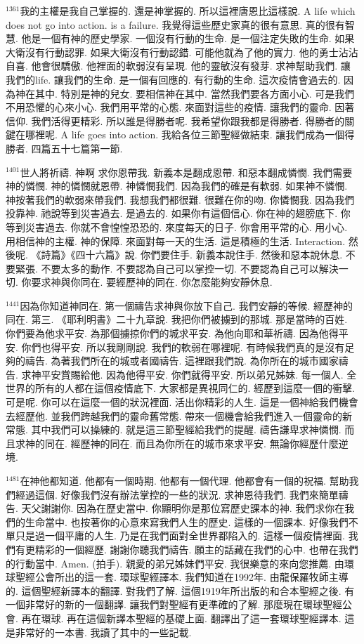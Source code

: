 \documentclass{book}
\begin{document}
$^{1361}$我的主權是我自己掌握的.
還是神掌握的.
所以這裡唐恩比這樣說.
A life which does not go into action.
is a failure.
我覺得這些歷史家真的很有意思.
真的很有智慧.
他是一個有神的歷史學家.
一個沒有行動的生命.
是一個注定失敗的生命.
如果大衛沒有行動認罪.
如果大衛沒有行動認錯.
可能他就為了他的實力.
他的勇士沾沾自喜.
他會很驕傲.
他裡面的軟弱沒有呈現.
他的靈敏沒有發芽.
求神幫助我們.
讓我們的life.
讓我們的生命.
是一個有回應的.
有行動的生命.
這次疫情會過去的.
因為神在其中.
特別是神的兒女.
要相信神在其中.
當然我們要各方面小心.
可是我們不用恐懼的心來小心.
我們用平常的心態.
來面對這些的疫情.
讓我們的靈命.
因著信仰.
我們活得更精彩.
所以誰是得勝者呢.
我希望你跟我都是得勝者.
得勝者的關鍵在哪裡呢.
A life goes into action.
我給各位三節聖經做結束.
讓我們成為一個得勝者.
四篇五十七篇第一節.

$^{1401}$世人將祈禱.
神啊 求你恩帶我.
新義本是翻成恩帶.
和惡本翻成憐憫.
我們需要神的憐憫.
神的憐憫就恩帶.
神憐憫我們.
因為我們的確是有軟弱.
如果神不憐憫.
神按著我們的軟弱來帶我們.
我想我們都很難.
很難在你的吻.
你憐憫我.
因為我們投靠神.
祂說等到災害過去.
是過去的.
如果你有這個信心.
你在神的翅膀底下.
你等到災害過去.
你就不會惶惶恐恐的.
來度每天的日子.
你會用平常的心.
用小心.
用相信神的主權.
神的保障.
來面對每一天的生活.
這是積極的生活.
Interaction.
然後呢.
《詩篇》《四十六篇》說.
你們要住手.
新義本說住手.
然後和惡本說休息.
不要緊張.
不要太多的動作.
不要認為自己可以掌控一切.
不要認為自己可以解決一切.
你要求神與你同在.
要經歷神的同在.
你怎麼能夠安靜休息.

$^{1441}$因為你知道神同在.
第一個禱告求神與你放下自己.
我們安靜的等候.
經歷神的同在.
第三.
《耶利明書》二十九章說.
我把你們被擄到的那城.
那是當時的百姓.
你們要為他求平安.
為那個擄掠你們的城求平安.
為他向耶和華祈禱.
因為他得平安.
你們也得平安.
所以我剛剛說.
我們的軟弱在哪裡呢.
有時候我們真的是沒有足夠的禱告.
為著我們所在的城或者國禱告.
這裡跟我們說.
為你所在的城市國家禱告.
求神平安賞賜給他.
因為他得平安.
你們就得平安.
所以弟兄姊妹.
每一個人.
全世界的所有的人都在這個疫情底下.
大家都是異視同仁的.
經歷到這麼一個的衝擊.
可是呢.
你可以在這麼一個的狀況裡面.
活出你精彩的人生.
這是一個神給我們機會去經歷他.
並我們跨越我們的靈命舊常態.
帶來一個機會給我們進入一個靈命的新常態.
其中我們可以操練的.
就是這三節聖經給我們的提醒.
禱告謙卑求神憐憫.
而且求神的同在.
經歷神的同在.
而且為你所在的城市來求平安.
無論你經歷什麼逆境.

$^{1481}$在神他都知道.
他都有一個時期.
他都有一個代理.
他都會有一個的祝福.
幫助我們經過這個.
好像我們沒有辦法掌控的一些的狀況.
求神恩待我們.
我們來簡單禱告.
天父謝謝你.
因為在歷史當中.
你顯明你是那位寫歷史課本的神.
我們求你在我們的生命當中.
也按著你的心意來寫我們人生的歷史.
這樣的一個課本.
好像我們不單只是過一個平庸的人生.
乃是在我們面對全世界都陷入的.
這樣一個疫情裡面.
我們有更精彩的一個經歷.
謝謝你聽我們禱告.
願主的話藏在我們的心中.
也帶在我們的行動當中.
Amen.
(拍手).
親愛的弟兄姊妹們平安.
我很樂意的來向您推薦.
由環球聖經公會所出的這一套.
環球聖經譯本.
我們知道在1992年.
由龍保羅牧師主導的.
這個聖經新譯本的翻譯.
對我們了解.
這個1919年所出版的和合本聖經之後.
有一個非常好的新的一個翻譯.
讓我們對聖經有更準確的了解.
那麼現在環球聖經公會.
再在環球.
再在這個新譯本聖經的基礎上面.
翻譯出了這一套環球聖經譯本.
這是非常好的一本書.
我讀了其中的一些記載.
\end{document}
